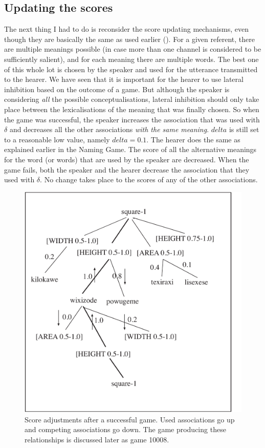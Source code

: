 \subsection{Updating the scores}

The next thing I had to do is reconsider the score
updating mechanisms, even though they are basically 
the same as used earlier (). 
For a given referent, there are multiple meanings possible
(in case more than one channel is considered to 
be sufficiently salient), and
for each meaning there are multiple words. The best 
one of this whole lot is chosen by the speaker and used
for the utterance transmitted to the hearer. We have 
seen that it is important for the hearer to use lateral
inhibition based on the outcome of a game. But although 
the speaker is considering {\itshape all} the possible 
conceptualisations, lateral
inhibition should only take place between the 
lexicalisations of the meaning that was finally chosen. 
So when the game was successful, 
the speaker increases the association that was used with $\delta$
and decreases all the other associations
{\itshape with the same meaning}. $delta$ is still set to a reasonable
low value, namely $delta = 0.1$. 
The hearer does the same as explained earlier in 
the Naming Game. The score of all
the alternative meanings for the word (or words) 
that are used by the speaker are decreased. 
When the game fails, both the speaker and the hearer 
decrease the association that they used with $\delta$. No
change takes place to the scores of any of the 
other associations. 


\begin{figure}[htbp]
  \centerline{\includegraphics[width=.50\textwidth]{chap6/figs/incr-decr2}}
\caption{\label{incr-decr2}
Score adjustments after a successful game. Used 
associations go up and competing associations go down.
The game producing these relationships is discussed
later as game 10008.}
\end{figure}

